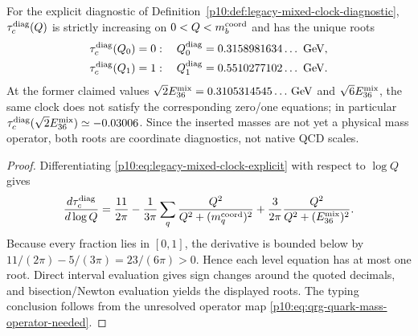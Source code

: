 \documentclass[12pt,a4paper]{article}
\begin{document}
\begin{theorem}
\label{p10:thm:native-strong-shell-transport-e36-wall}
For the explicit diagnostic of Definition~\ref{p10:def:legacy-mixed-clock-diagnostic}, \(\tau_c^{\rm diag}(Q)\) is strictly increasing on \(0<Q<m_b^{\rm coord}\) and has the unique roots
\begin{equation}
\label{p10:eq:corrected-mixed-clock-root}
\begin{gathered}
\tau_c^{\rm diag}(Q_0)=0:\quad
Q_0^{\rm diag}=0.3158981634\ldots\ \mathrm{GeV},\\
\tau_c^{\rm diag}(Q_1)=1:\quad
Q_1^{\rm diag}=0.5510277102\ldots\ \mathrm{GeV}.
\end{gathered}
\end{equation}
At the former claimed values \(\sqrt2E_{36}^{\rm mix}=0.3105314545\ldots\,\mathrm{GeV}\) and \(\sqrt6E_{36}^{\rm mix}\), the same clock does not satisfy the corresponding zero/one equations; in particular \(\tau_c^{\rm diag}(\sqrt2E_{36}^{\rm mix})\simeq-0.03006\).  Since the inserted masses are not yet a physical mass operator, both roots are coordinate diagnostics, not native QCD scales.
\end{theorem}
\begin{proof}
Differentiating \eqref{p10:eq:legacy-mixed-clock-explicit} with respect to $\log Q$ gives
\[
\frac{d\tau_c^{\rm diag}}{d\log Q}
=\frac{11}{2\pi}
-\frac1{3\pi}\sum_q\frac{Q^2}{Q^2+(m_q^{\rm coord})^2}
+\frac3{2\pi}\frac{Q^2}{Q^2+(E_{36}^{\rm mix})^2}.
\]
Because every fraction lies in $[0,1]$, the derivative is bounded below by $11/(2\pi)-5/(3\pi)=23/(6\pi)>0$.  Hence each level equation has at most one root.  Direct interval evaluation gives sign changes around the quoted decimals, and bisection/Newton evaluation yields the displayed roots.  The typing conclusion follows from the unresolved operator map \eqref{p10:eq:qrg-quark-mass-operator-needed}.
\end{proof}
\end{document}
